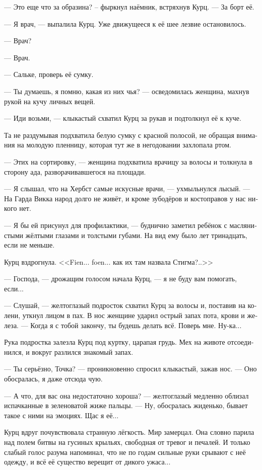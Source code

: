 \documentclass[a4paper,12pt,fleqn]{book}\usepackage{polyglossia}\setdefaultlanguage[babelshorthands=true]{russian}\setotherlanguage{english}\defaultfontfeatures{Ligatures=TeX,Mapping=tex-text}\usepackage{xcolor}\newcommand{\ml}[3]{#2}
\begin{document}
--- Это еще что за образина? -- фыркнул наёмник, встряхнув Курц.
--- За борт её.

--- Я врач, --- выпалила Курц.
Уже движущееся к её шее лезвие остановилось.

--- Врач?

--- Врач.

--- Сальке, проверь её сумку.

--- Ты думаешь, я помню, какая из них чья? --- осведомилась женщина, махнув рукой на кучу личных вещей.

--- Иди возьми, --- клыкастый схватил Курц за рукав и подтолкнул её к куче.

Та не раздумывая подхватила белую сумку с красной полосой, не обращая внимания на молодую пленницу, которая тут же в негодовании захлопала ртом.

--- Этих на сортировку, --- женщина подхватила врачицу за волосы и толкнула в сторону ада, разворачивавшегося на площади.

--- Я слышал, что на Хербст самые искусные врачи, --- ухмыльнулся лысый.
--- На Гарда Викка народ долго не живёт, и кроме зубодёров и костоправов у нас никого нет.

--- Я бы ей присунул для профилактики, --- буднично заметил ребёнок с маслянистыми жёлтыми глазами и толстыми губами.
На вид ему было лет тринадцать, если не меньше.

Курц вздрогнула.
<<Fien... foen... как их там назвала Стигма?..>>

--- Господа, --- дрожащим голосом начала Курц, --- я не буду вам помогать, если...

--- Слушай, --- желтоглазый подросток схватил Курц за волосы и, поставив на колени, уткнул лицом в пах.
В нос женщине ударил острый запах пота, крови и железа.
--- Когда я с тобой закончу, ты будешь делать всё.
Поверь мне.
Ну-ка...

Рука подростка залезла Курц под куртку, царапая грудь.
Мех на животе отсоединился, и вокруг разлился знакомый запах.

--- Ты серьёзно, Точка? --- проникновенно спросил клыкастый, зажав нос.
--- Оно обосралась, я даже отсюда чую.

--- А что, для вас она недостаточно хороша? --- желтоглазый медленно облизал испачканные в зеленоватой жиже пальцы.
--- Ну, обосралась жиденько, бывает такое с ними на эмоциях.
Щас я её...

Курц вдруг почувствовала странную лёгкость.
Мир замерцал.
Она словно парила над полем битвы на гусиных крыльях, свободная от тревог и печалей.
И только слабый голос разума напоминал, что не по годам сильные руки срывают с неё одежду, и всё её существо верещит от дикого ужаса...
\end{document}
